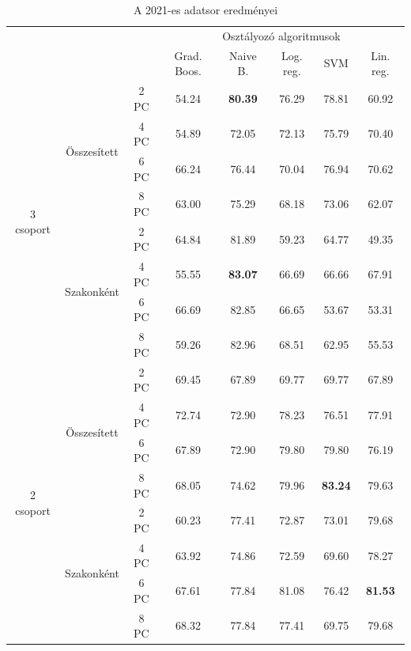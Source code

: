 \documentclass[12pt]{article}
\begin{document}
\begin{table}[H]
\centering
\begin{tabular}{ccc|ccccc}

    &&&\multicolumn{5}{c}{Osztályozó algoritmusok} \\
    &&& Grad. Boos. &  Naive B. & Log. reg.  &  SVM & Lin. reg. \\ 
        \hline
    \multirow{8}{*}{3 csoport}& \multirow{4}{*}{Összesített}&2 PC&54.24&\textbf{80.39}&76.29&78.81&60.92 \\
    												&&4 PC&54.89&72.05&72.13&75.79&70.40\\
    												&&6 PC&66.24&76.44&70.04&76.94&70.62\\
    												&&8 PC&63.00&75.29&68.18&73.06&62.07\\\cline{3-8}%
    						 & \multirow{4}{*}{Szakonként}&2 PC&64.84&81.89&59.23&64.77&49.35\\
    												&&4 PC&55.55&\textbf{83.07}&66.69&66.66&67.91\\
    												&&6 PC&66.69&82.85&66.65&53.67&53.31\\
    												&&8 PC&59.26&82.96&68.51&62.95&55.53\\
    \hline
    \hline
    \multirow{8}{*}{2 csoport}& \multirow{4}{*}{Összesített}&2 PC&69.45&67.89&69.77&69.77&67.89 \\
    												&&4 PC&72.74&72.90&78.23&76.51&77.91\\
    												&&6 PC&67.89&72.90&79.80&79.80&76.19\\
    												&&8 PC&68.05&74.62&79.96&\textbf{83.24}&79.63\\\cline{3-8}
    						 & \multirow{4}{*}{Szakonként}&2 PC&60.23&77.41&72.87&73.01&79.68\\
    												&&4 PC&63.92&74.86&72.59&69.60&78.27\\
    												&&6 PC&67.61&77.84&81.08&76.42&\textbf{81.53}\\
    												&&8 PC&68.32&77.84&77.41&69.75&79.68\\
    												\hline
\end{tabular}
\caption{A 2021-es adatsor eredményei}
\label{tab:multicol2}
\end{table}
\end{document}
